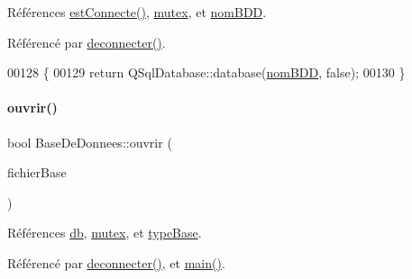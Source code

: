 Références \hyperlink{class_base_de_donnees_a00388973f3ec42e5c8e76e7af7e124b2}{est\+Connecte()}, \hyperlink{class_base_de_donnees_aa1b4696fac87a740f914aa73739086f2}{mutex}, et \hyperlink{class_base_de_donnees_a67c1d973c267a8f5fd6d7461550faa11}{nom\+B\+DD}.



Référencé par \hyperlink{class_base_de_donnees_ae780999d25a26a0e4dbe0706a4785978}{deconnecter()}.


\begin{DoxyCode}
00128 \{
00129     \textcolor{keywordflow}{return} QSqlDatabase::database(\hyperlink{class_base_de_donnees_a67c1d973c267a8f5fd6d7461550faa11}{nomBDD}, \textcolor{keyword}{false});
00130 \}
\end{DoxyCode}
\mbox{\label{class_base_de_donnees_a7f6a5510b08017b0d99115a84252f186}} 
\paragraph{\texorpdfstring{ouvrir()}{ouvrir()}\hspace{0.1cm}{\footnotesize\ttfamily [1/2]}}
{\footnotesize\ttfamily bool Base\+De\+Donnees\+::ouvrir (\begin{DoxyParamCaption}\item[{Q\+String}]{fichier\+Base }\end{DoxyParamCaption})}



Références \hyperlink{class_base_de_donnees_a3e738dcf443370c46a541677ab619f06}{db}, \hyperlink{class_base_de_donnees_aa1b4696fac87a740f914aa73739086f2}{mutex}, et \hyperlink{class_base_de_donnees_ab682b82167f494496a6531bfe522b42b}{type\+Base}.



Référencé par \hyperlink{class_base_de_donnees_ae780999d25a26a0e4dbe0706a4785978}{deconnecter()}, et \hyperlink{terminalmobile_2main_8cpp_a0ddf1224851353fc92bfbff6f499fa97}{main()}.


